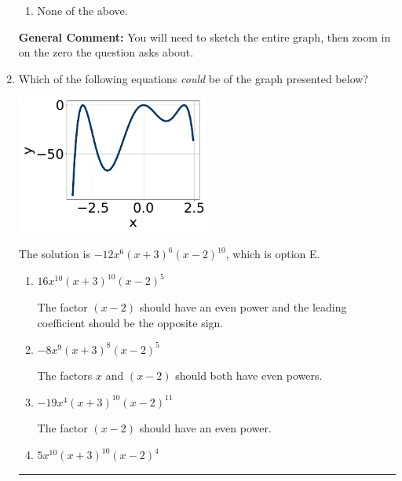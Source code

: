 \documentclass{extbook}[14pt]
\newcommand{\litem}[1]{\item #1

\rule{\textwidth}{0.4pt}}
\begin{document}
\begin{enumerate}
{\begin{enumerate}[label=\Alph*.]
\item None of the above.\end{enumerate}
\textbf{General Comment:} You will need to sketch the entire graph, then zoom in on the zero the question asks about.
}
\litem{
Which of the following equations \textit{could} be of the graph presented below?

\begin{center}
    \includegraphics[width=0.5\textwidth]{../Figures/polyGraphToFunctionCopyC.png}
\end{center}




The solution is \( -12x^{6} (x + 3)^{6} (x - 2)^{10} \), which is option E.\begin{enumerate}[label=\Alph*.]
\item \( 16x^{10} (x + 3)^{10} (x - 2)^{5} \)

The factor $(x - 2)$ should have an even power and the leading coefficient should be the opposite sign.
\item \( -8x^{9} (x + 3)^{8} (x - 2)^{5} \)

The factors $x$ and $(x - 2)$ should both have even powers.
\item \( -19x^{4} (x + 3)^{10} (x - 2)^{11} \)

The factor $(x - 2)$ should have an even power.
\item \( 5x^{10} (x + 3)^{10} (x - 2)^{4} \)


\end{enumerate}}
\end{enumerate}
\end{document}
